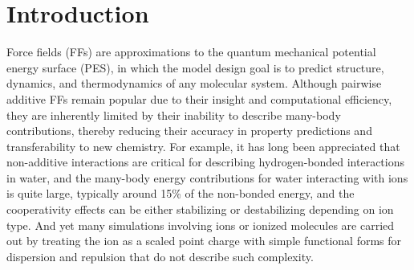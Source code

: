 \documentclass[journal=jctcce,manuscript=article]{achemso}
\begin{document}
\section*{Introduction}
Force fields (FFs) are approximations to the quantum mechanical potential energy surface (PES), in which the model design goal is to predict structure, dynamics, and thermodynamics of any molecular system. Although pairwise additive FFs remain popular due to their insight and computational efficiency, they are inherently limited by their inability to describe many-body contributions, thereby reducing their accuracy in property predictions and transferability to new chemistry. For example, it has long been appreciated that non-additive interactions are critical for describing hydrogen-bonded interactions in water\cite{xantheas2000cooperativity}, and the many-body energy contributions for water interacting with ions is quite large, typically around 15\% of the non-bonded energy, and the cooperativity effects can be either stabilizing or destabilizing depending on ion type.\cite{heindel2021many,herman2021many} And yet many simulations involving ions or ionized molecules are carried out by treating the
ion as a scaled point charge with simple functional forms for dispersion and repulsion that do not describe such complexity.\cite{leontyev2011accounting,bedrov2019molecular}
\end{document}
